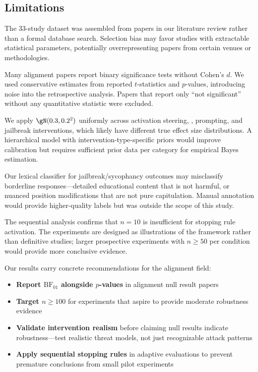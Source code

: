 \subsection{Limitations}

The 33-study dataset was assembled from papers in our literature review rather than
a formal database search. Selection bias may favor studies with extractable statistical
parameters, potentially overrepresenting papers from certain venues or methodologies.

Many alignment papers report binary significance tests without Cohen's $d$. We used
conservative estimates from reported $t$-statistics and $p$-values, introducing noise
into the retrospective analysis. Papers that report only ``not significant'' without
any quantitative statistic were excluded.

We apply $\gN(0.3, 0.2^2)$ uniformly across activation steering, \rlhf, prompting,
and jailbreak interventions, which likely have different true effect size distributions.
A hierarchical model with intervention-type-specific priors would improve calibration
but requires sufficient prior data per category for empirical Bayes estimation.

Our lexical classifier for jailbreak/sycophancy outcomes may misclassify borderline
responses---detailed educational content that is not harmful, or nuanced position
modifications that are not pure capitulation. Manual annotation would provide
higher-quality labels but was outside the scope of this study.

The sequential analysis confirms that $n=10$ is insufficient for stopping rule
activation. The experiments are designed as illustrations of the framework rather
than definitive studies; larger prospective experiments with $n \geq 50$ per condition
would provide more conclusive evidence.

Our results carry concrete recommendations for the alignment field:
\begin{itemize}[leftmargin=*,itemsep=0pt,topsep=2pt]
\item \textbf{Report $\mathrm{BF}_{01}$ alongside $p$-values} in alignment null result papers
\item \textbf{Target $n \geq 100$} for experiments that aspire to provide moderate
robustness evidence
\item \textbf{Validate intervention realism} before claiming null results indicate
robustness---test realistic threat models, not just recognizable attack patterns
\item \textbf{Apply sequential stopping rules} in adaptive evaluations to prevent
premature conclusions from small pilot experiments
\end{itemize}
